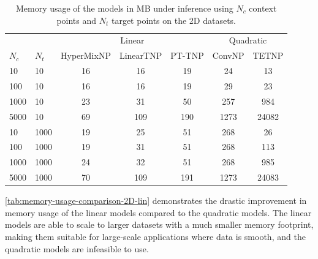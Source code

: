 \documentclass[../../main.tex]{subfiles}
\begin{document}
\begin{table}[H]
    \centering
    \begin{tabular}{@{}llccccc@{}}
    \toprule
    &  & \multicolumn{3}{c}{Linear} & \multicolumn{2}{c}{Quadratic} \\ \cmidrule(lr){3-5} \cmidrule(lr){6-7}
    $N_c$ & $N_t$  & HyperMixNP & LinearTNP & PT-TNP & ConvNP & TETNP \\ \midrule
    10     & 10    & 16         & 16        & 19     & 24     & 13    \\
    100    & 10    & 16         & 16        & 19     & 29     & 23    \\
    1000   & 10    & 23         & 31        & 50     & 257    & 984   \\
    5000   & 10    & 69         & 109       & 190    & 1273   & 24082 \\ \midrule
    10     & 1000  & 19         & 25        & 51     & 268    & 26    \\
    100    & 1000  & 19         & 31        & 51     & 268    & 113   \\
    1000   & 1000  & 24         & 32        & 51     & 268    & 985   \\
    5000   & 1000  & 70         & 109       & 191    & 1273   & 24083 \\ \bottomrule
    \end{tabular}
    \caption{Memory usage of the models in MB under inference using $N_c$ context points and $N_t$ target points on the 2D datasets.}
    \label{tab:memory-usage-comparison-2D-lin}
\end{table}
\FloatBarrier

\autoref{tab:memory-usage-comparison-2D-lin} demonstrates the drastic improvement in memory usage of the linear models compared to the quadratic models. The linear models are able to scale to larger datasets with a much smaller memory footprint, making them suitable for large-scale applications where data is smooth, and the quadratic models are infeasible to use. 



\ifSubfilesClassLoaded{%
    \printbibliography{}
}{} 
\end{document}

